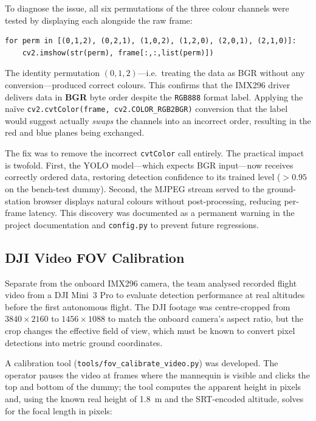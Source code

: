 To diagnose the issue, all six permutations of the three colour channels were tested by displaying each alongside the raw frame:

\begin{verbatim}
for perm in [(0,1,2), (0,2,1), (1,0,2), (1,2,0), (2,0,1), (2,1,0)]:
    cv2.imshow(str(perm), frame[:,:,list(perm)])
\end{verbatim}

The identity permutation $(0,1,2)$---i.e.\ treating the data as BGR without any conversion---produced correct colours. This confirms that the IMX296 driver delivers data in \textbf{BGR} byte order despite the \texttt{RGB888} format label. Applying the na\"ive \texttt{cv2.cvtColor(frame, cv2.COLOR\_RGB2BGR)} conversion that the label would suggest actually \emph{swaps} the channels into an incorrect order, resulting in the red and blue planes being exchanged.

The fix was to remove the incorrect \texttt{cvtColor} call entirely. The practical impact is twofold. First, the YOLO model---which expects BGR input---now receives correctly ordered data, restoring detection confidence to its trained level ($>0.95$ on the bench-test dummy). Second, the MJPEG stream served to the ground-station browser displays natural colours without post-processing, reducing per-frame latency. This discovery was documented as a permanent warning in the project documentation and \texttt{config.py} to prevent future regressions.

\subsection{DJI Video FOV Calibration}\label{sec:cal:dji}

Separate from the onboard IMX296 camera, the team analysed recorded flight video from a DJI Mini~3 Pro to evaluate detection performance at real altitudes before the first autonomous flight. The DJI footage was centre-cropped from $3840\times2160$ to $1456\times1088$ to match the onboard camera's aspect ratio, but the crop changes the effective field of view, which must be known to convert pixel detections into metric ground coordinates.

A calibration tool (\texttt{tools/fov\_calibrate\_video.py}) was developed. The operator pauses the video at frames where the mannequin is visible and clicks the top and bottom of the dummy; the tool computes the apparent height in pixels and, using the known real height of \SI{1.8}{\metre} and the SRT-encoded altitude, solves for the focal length in pixels:

